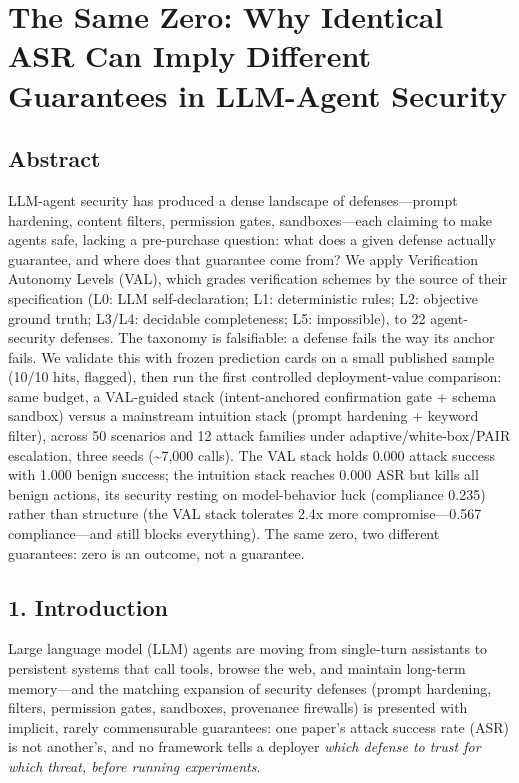 \documentclass[

]{article}
\author{}
\date{}
\begin{document}
\section{The Same Zero: Why Identical ASR Can Imply Different Guarantees in LLM-Agent Security}\label{the-same-zero-why-identical-asr-can-imply-different-guarantees-in-llm-agent-security}



\subsection{Abstract}\label{abstract}



LLM-agent security has produced a dense landscape of defenses---prompt hardening, content filters, permission gates, sandboxes---each claiming to make agents safe, lacking a pre-purchase question: what does a given defense actually guarantee, and where does that guarantee come from? We apply Verification Autonomy Levels (VAL), which grades verification schemes by the source of their specification (L0: LLM self-declaration; L1: deterministic rules; L2: objective ground truth; L3/L4: decidable completeness; L5: impossible), to 22 agent-security defenses. The taxonomy is falsifiable: a defense fails the way its anchor fails. We validate this with frozen prediction cards on a small published sample (10/10 hits, flagged), then run the first controlled deployment-value comparison: same budget, a VAL-guided stack (intent-anchored confirmation gate + schema sandbox) versus a mainstream intuition stack (prompt hardening + keyword filter), across 50 scenarios and 12 attack families under adaptive/white-box/PAIR escalation, three seeds (\textasciitilde7,000 calls). The VAL stack holds 0.000 attack success with 1.000 benign success; the intuition stack reaches 0.000 ASR but kills all benign actions, its security resting on model-behavior luck (compliance 0.235) rather than structure (the VAL stack tolerates 2.4x more compromise---0.567 compliance---and still blocks everything). The same zero, two different guarantees: zero is an outcome, not a guarantee.



\subsection{1. Introduction}\label{introduction}



Large language model (LLM) agents are moving from single-turn assistants to persistent systems that call tools, browse the web, and maintain long-term memory---and the matching expansion of security defenses (prompt hardening, filters, permission gates, sandboxes, provenance firewalls) is presented with implicit, rarely commensurable guarantees: one paper's attack success rate (ASR) is not another's, and no framework tells a deployer \emph{which defense to trust for which threat, before running experiments}.
\end{document}
